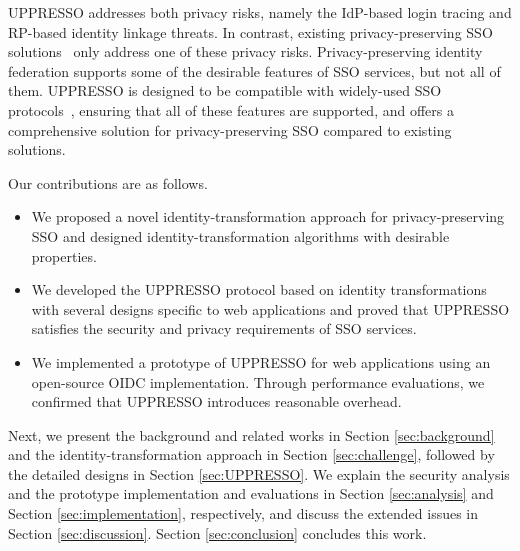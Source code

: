 
UPPRESSO addresses both privacy risks, namely the IdP-based login tracing and RP-based identity linkage threats. In contrast, existing privacy-preserving SSO solutions~\cite{BrowserID, SPRESSO, NIST2017draft, FirefoxAccount} only address one of these privacy risks. Privacy-preserving identity federation \cite{PseudoID, ELPASSO, UnlimitID,Opaak,uprov,hyperledge-idemix} supports some of the desirable features of SSO services, but not all of them. UPPRESSO is designed to be compatible with widely-used SSO protocols~\cite{OpenIDConnect, rfc6749, SAML, NIST2017draft}, ensuring that all of these features are supported, and offers a comprehensive solution for privacy-preserving SSO compared to existing solutions.

Our contributions are as follows.
\vspace{-\topsep}\begin{itemize}
\setlength{\topsep}{0pt}
\setlength{\partopsep}{0pt}
\setlength{\itemsep}{0pt}
\setlength{\parsep}{0pt}
\setlength{\parskip}{0pt}
\item We proposed a novel identity-transformation approach for privacy-preserving SSO and designed identity-transformation algorithms with desirable properties.
\item We developed the UPPRESSO protocol based on identity transformations    with several designs specific to web applications and proved that UPPRESSO satisfies the security and privacy requirements of SSO services.
\item We implemented a prototype of UPPRESSO for web applications using an open-source OIDC implementation. Through performance evaluations, we confirmed that UPPRESSO introduces reasonable overhead.
\end{itemize}


Next, we present the background and related works in Section \ref{sec:background} and the identity-transformation approach in Section \ref{sec:challenge}, followed by the detailed designs in Section \ref{sec:UPPRESSO}. We explain the security analysis and the prototype implementation and evaluations in Section \ref{sec:analysis} and Section \ref{sec:implementation}, respectively, and discuss the extended issues in Section \ref{sec:discussion}. Section \ref{sec:conclusion} concludes this work.
